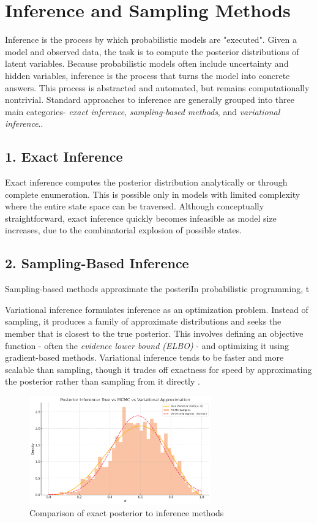 \documentclass[11pt]{report}
\begin{document}
\section{Inference and Sampling Methods}

Inference is the process by which probabilistic models are "executed". Given a model and observed data, the task is to compute the posterior distributions of latent variables.
Because probabilistic models often include uncertainty and hidden variables, inference is the process that turns the model into concrete answers.
This process is abstracted and automated, but remains computationally nontrivial. Standard approaches to inference are generally grouped 
into three main categories- \textit{exact inference}, \textit{sampling-based methods}, and \textit{variational inference}.\cite{bishop2006prml, blei2017vi, goodman2014dippl}.

\subsection*{1. Exact Inference}

Exact inference computes the posterior distribution analytically or through complete enumeration. This is possible only in models with limited complexity where the 
entire state space can be traversed. Although conceptually straightforward, exact inference quickly becomes infeasible as model size increases, due to the combinatorial
explosion of possible states.

\subsection*{2. Sampling-Based Inference}

Sampling-based methods approximate the posteriIn probabilistic programming, t

Variational inference formulates inference as an optimization problem. Instead of sampling, it produces a family of approximate distributions and seeks the member that 
is closest to the true posterior. This involves defining an objective function - often the \textit{evidence lower bound (ELBO)} - and optimizing it using gradient-based methods.
Variational inference tends to be faster and more scalable than sampling, though it trades off exactness for speed by approximating the posterior rather than sampling
from it directly \cite{blei2017vi}.


\begin{figure}[htbp]
  \centering
  \includegraphics[width=0.7\textwidth]{graphics/inferencePlot.png}
  \caption{Comparison of exact posterior to inference methods}
  \label{fig:inference_plot}
\end{figure}
\end{document}
